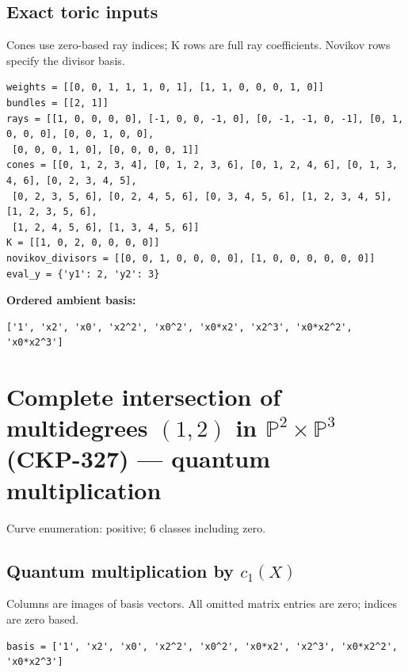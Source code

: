 \documentclass[10pt,a4paper]{article}
\begin{document}
\subsection*{Exact toric inputs}
Cones use zero-based ray indices; K rows are full ray coefficients. Novikov rows specify the divisor basis.

\begin{lstlisting}
weights = [[0, 0, 1, 1, 1, 0, 1], [1, 1, 0, 0, 0, 1, 0]]
bundles = [[2, 1]]
rays = [[1, 0, 0, 0, 0], [-1, 0, 0, -1, 0], [0, -1, -1, 0, -1], [0, 1, 0, 0, 0], [0, 0, 1, 0, 0],
 [0, 0, 0, 1, 0], [0, 0, 0, 0, 1]]
cones = [[0, 1, 2, 3, 4], [0, 1, 2, 3, 6], [0, 1, 2, 4, 6], [0, 1, 3, 4, 6], [0, 2, 3, 4, 5],
 [0, 2, 3, 5, 6], [0, 2, 4, 5, 6], [0, 3, 4, 5, 6], [1, 2, 3, 4, 5], [1, 2, 3, 5, 6],
 [1, 2, 4, 5, 6], [1, 3, 4, 5, 6]]
K = [[1, 0, 2, 0, 0, 0, 0]]
novikov_divisors = [[0, 0, 1, 0, 0, 0, 0], [1, 0, 0, 0, 0, 0, 0]]
eval_y = {'y1': 2, 'y2': 3}
\end{lstlisting}

\textbf{Ordered ambient basis:}
\begin{lstlisting}
['1', 'x2', 'x0', 'x2^2', 'x0^2', 'x0*x2', 'x2^3', 'x0*x2^2', 'x0*x2^3']
\end{lstlisting}

\clearpage\section*{Complete intersection of multidegrees $(1,2)$ in $\mathbb P^{2}\times \mathbb P^{3}$ (CKP-327) --- quantum multiplication}

Curve enumeration: positive; 6 classes including zero.
\subsection*{Quantum multiplication by $c_1(X)$}
Columns are images of basis vectors. All omitted matrix entries are zero; indices are zero based.

\begin{lstlisting}
basis = ['1', 'x2', 'x0', 'x2^2', 'x0^2', 'x0*x2', 'x2^3', 'x0*x2^2', 'x0*x2^3']
\end{lstlisting}
\end{document}
